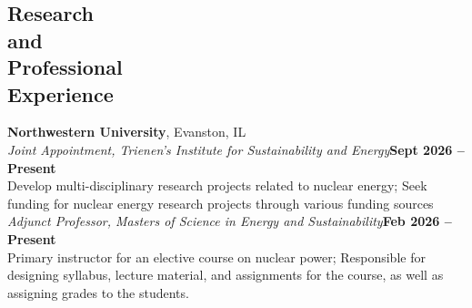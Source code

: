 \documentclass[margin,line]{resume}
\begin{document}
\begin{resume}
    \section{\mysidestyle Research\\and\\Professional\\Experience}
    \textbf{Northwestern University}, Evanston, IL \vspace{1mm}\\
                \textsl{Joint Appointment, Trienen's Institute for Sustainability and Energy}\hfill \textbf{Sept 2026 -- Present}\\
                Develop multi-disciplinary research projects related to nuclear energy; 
                Seek funding for nuclear energy research projects through various funding 
                sources \vspace{2mm}\\
                \textsl{Adjunct Professor, Masters of Science in Energy and Sustainability}\hfill \textbf{Feb 2026 -- Present}\\
                Primary instructor for an elective course on nuclear power; Responsible for designing 
                syllabus, lecture material, and assignments for the course, as well as assigning grades to 
                the students. 


\end{resume}
\end{document}
